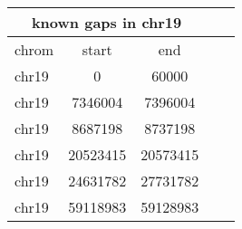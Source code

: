 \documentclass{standalone}
\begin{document}
\begin{tabular}{|l|c|c|c|c|}
\hline
\multicolumn{3}{|c|}{\textbf{known gaps in chr19}}\\
\hline 

chrom & start & end \\
\hline
chr19 & 0 & 60000 \\
chr19 & 7346004 & 7396004 \\
chr19 & 8687198 & 8737198 \\
chr19 & 20523415 & 20573415 \\
chr19 & 24631782 & 27731782 \\
chr19 & 59118983 & 59128983 \\
\hline
\end{tabular}
\end{document}
